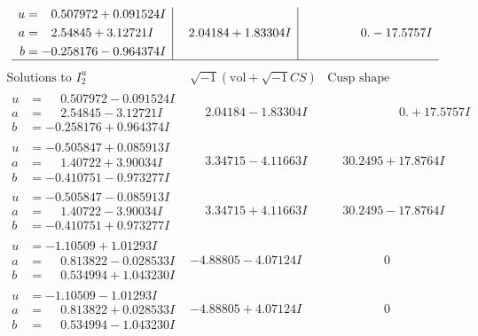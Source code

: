 \documentclass[1p]{elsarticle_modified}
\theoremstyle{definition}
\newcommand{\I}{\sqrt{-1}}
\begin{document}
$$\begin{array}{c|c|c}
\begin{aligned}
u &= \phantom{-}0.507972 + 0.091524 I \\
a &= \phantom{-}2.54845 + 3.12721 I \\
b &= -0.258176 - 0.964374 I\end{aligned}
 & \phantom{-}2.04184 + 1.83304 I & \phantom{-0.000000 } 0. - 17.5757 I\\
 \hline 
 \end{array}$$\newpage$$\begin{array}{c|c|c}  
\text{Solutions to }I^u_{2}& \I (\text{vol} + \sqrt{-1}CS) & \text{Cusp shape}\\
 \hline 
\begin{aligned}
u &= \phantom{-}0.507972 - 0.091524 I \\
a &= \phantom{-}2.54845 - 3.12721 I \\
b &= -0.258176 + 0.964374 I\end{aligned}
 & \phantom{-}2.04184 - 1.83304 I & \phantom{-0.000000 -}0. + 17.5757 I \\ \hline\begin{aligned}
u &= -0.505847 + 0.085913 I \\
a &= \phantom{-}1.40722 + 3.90034 I \\
b &= -0.410751 - 0.973277 I\end{aligned}
 & \phantom{-}3.34715 - 4.11663 I & \phantom{-}30.2495 + 17.8764 I \\ \hline\begin{aligned}
u &= -0.505847 - 0.085913 I \\
a &= \phantom{-}1.40722 - 3.90034 I \\
b &= -0.410751 + 0.973277 I\end{aligned}
 & \phantom{-}3.34715 + 4.11663 I & \phantom{-}30.2495 - 17.8764 I \\ \hline\begin{aligned}
u &= -1.10509 + 1.01293 I \\
a &= \phantom{-}0.813822 - 0.028533 I \\
b &= \phantom{-}0.534994 + 1.043230 I\end{aligned}
 & -4.88805 - 4.07124 I & \phantom{-0.000000 } 0 \\ \hline\begin{aligned}
u &= -1.10509 - 1.01293 I \\
a &= \phantom{-}0.813822 + 0.028533 I \\
b &= \phantom{-}0.534994 - 1.043230 I\end{aligned}
 & -4.88805 + 4.07124 I & \phantom{-0.000000 } 0 \\ \hline\begin{aligned}

\end{aligned}
\end{array}$$
\end{document}
